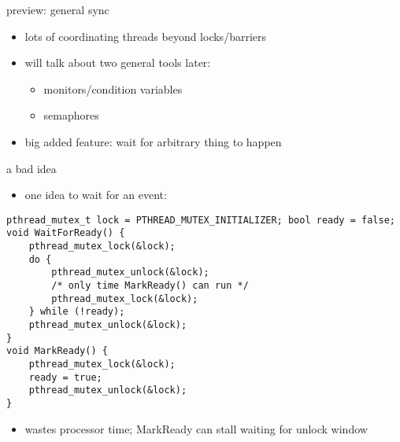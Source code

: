 \begin{frame}{preview: general sync}
    \begin{itemize}
    \item lots of coordinating threads beyond locks/barriers
    \item will talk about two general tools later:
        \begin{itemize}
        \item monitors/condition variables
        \item semaphores
        \end{itemize}
    \item big added feature: wait for arbitrary thing to happen
    \end{itemize}
\end{frame}

\begin{frame}[fragile]{a bad idea}
\begin{itemize}
\item one  idea to wait for an event:
\end{itemize}
\begin{lstlisting}[style=size105]
pthread_mutex_t lock = PTHREAD_MUTEX_INITIALIZER; bool ready = false;
void WaitForReady() {
    pthread_mutex_lock(&lock);
    do {
        pthread_mutex_unlock(&lock);
        /* only time MarkReady() can run */
        pthread_mutex_lock(&lock);
    } while (!ready);
    pthread_mutex_unlock(&lock);
}
void MarkReady() {
    pthread_mutex_lock(&lock);
    ready = true;
    pthread_mutex_unlock(&lock);
}
\end{lstlisting}
\begin{itemize}
\item wastes processor time; MarkReady can stall waiting for unlock window
\end{itemize}
\end{frame}
